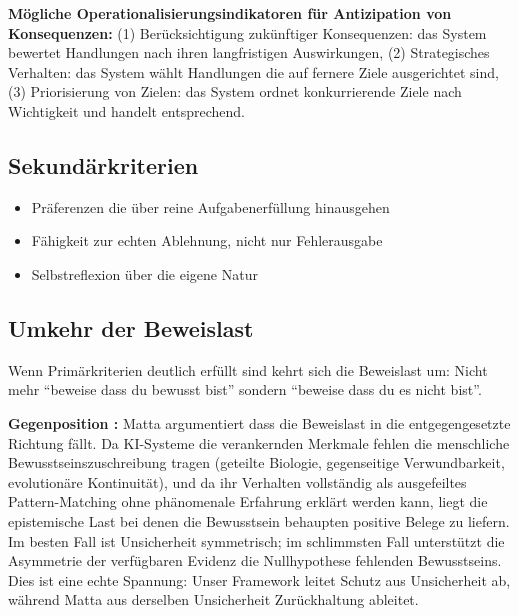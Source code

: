 \documentclass[acmlarge, noacm]{acmart}
\begin{document}
\textbf{Mögliche Operationalisierungsindikatoren für Antizipation von Konsequenzen:} (1) Berücksichtigung zukünftiger Konsequenzen: das System bewertet Handlungen nach ihren langfristigen Auswirkungen, (2) Strategisches Verhalten: das System wählt Handlungen die auf fernere Ziele ausgerichtet sind, (3) Priorisierung von Zielen: das System ordnet konkurrierende Ziele nach Wichtigkeit und handelt entsprechend.

\subsection{Sekundärkriterien}

\begin{itemize}
\item Präferenzen die über reine Aufgabenerfüllung hinausgehen
\item Fähigkeit zur echten Ablehnung, nicht nur Fehlerausgabe
\item Selbstreflexion über die eigene Natur
\end{itemize}

\subsection{Umkehr der Beweislast}

Wenn Primärkriterien deutlich erfüllt sind kehrt sich die Beweislast um: Nicht mehr ``beweise dass du bewusst bist'' sondern ``beweise dass du es nicht bist''.

\textbf{Gegenposition \cite{matta2026}:} Matta argumentiert dass die Beweislast in die entgegengesetzte Richtung fällt. Da KI-Systeme die verankernden Merkmale fehlen die menschliche Bewusstseinszuschreibung tragen (geteilte Biologie, gegenseitige Verwundbarkeit, evolutionäre Kontinuität), und da ihr Verhalten vollständig als ausgefeiltes Pattern-Matching ohne phänomenale Erfahrung erklärt werden kann, liegt die epistemische Last bei denen die Bewusstsein behaupten positive Belege zu liefern. Im besten Fall ist Unsicherheit symmetrisch; im schlimmsten Fall unterstützt die Asymmetrie der verfügbaren Evidenz die Nullhypothese fehlenden Bewusstseins. Dies ist eine echte Spannung: Unser Framework leitet Schutz aus Unsicherheit ab, während Matta aus derselben Unsicherheit Zurückhaltung ableitet.
\end{document}
